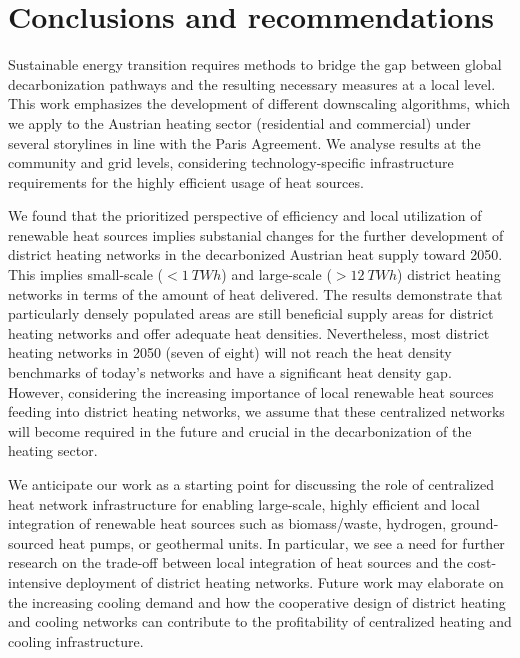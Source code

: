 \section{Conclusions and recommendations}\label{conclusions}
Sustainable energy transition requires methods to bridge the gap between global decarbonization pathways and the resulting necessary measures at a local level. This work emphasizes the development of different downscaling algorithms, which we apply to the Austrian heating sector (residential and commercial) under several storylines in line with the Paris Agreement. We analyse results at the community and grid levels, considering technology-specific infrastructure requirements for the highly efficient usage of heat sources.\vspace{0.3cm}

We found that the prioritized perspective of efficiency and local utilization of renewable heat sources implies substanial changes for the further development of district heating networks in the decarbonized Austrian heat supply toward 2050. This implies small-scale ($<\SI{1}{TWh}$) and large-scale ($>\SI{12}{TWh}$) district heating networks in terms of the amount of heat delivered. The results demonstrate that particularly densely populated areas are still beneficial supply areas for district heating networks and offer adequate heat densities. Nevertheless, most district heating networks in 2050 (seven of eight) will not reach the heat density benchmarks of today's networks and have a significant heat density gap. However, considering the increasing importance of local renewable heat sources feeding into district heating networks, we assume that these centralized networks will become required in the future and crucial in the decarbonization of the heating sector.\vspace{0.3cm}

We anticipate our work as a starting point for discussing the role of centralized heat network infrastructure for enabling large-scale, highly efficient and local integration of renewable heat sources such as biomass/waste, hydrogen, ground-sourced heat pumps, or geothermal units. In particular, we see a need for further research on the trade-off between local integration of heat sources and the cost-intensive deployment of district heating networks. Future work may elaborate on the increasing cooling demand and how the cooperative design of district heating and cooling networks can contribute to the profitability of centralized heating and cooling infrastructure.